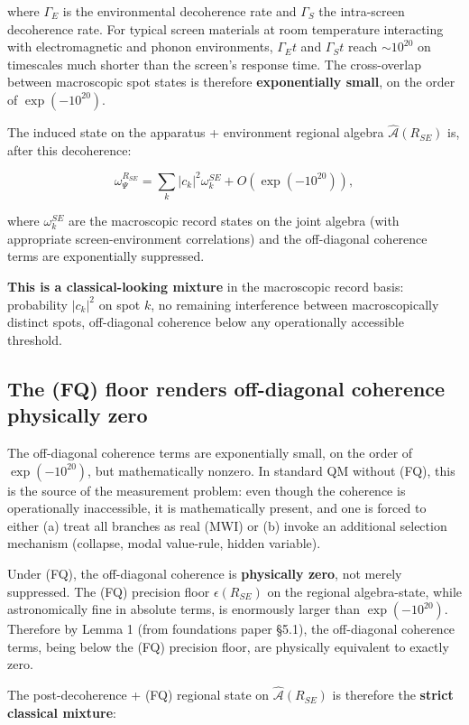 \documentclass[11pt,a4paper]{article}
\begin{document}
where $\Gamma_E$ is the environmental decoherence rate and $\Gamma_S$ the intra-screen decoherence rate. For typical screen materials at room temperature interacting with electromagnetic and phonon environments, $\Gamma_E t$ and $\Gamma_S t$ reach $\sim 10^{20}$ on timescales much shorter than the screen's response time. The cross-overlap between macroscopic spot states is therefore \textbf{exponentially small}, on the order of $\exp(-10^{20})$.

The induced state on the apparatus + environment regional algebra $\hat{\mathcal{A}}(R_{SE})$ is, after this decoherence:

\[
\omega_\Psi^{R_{SE}} = \sum_k |c_k|^2 \omega_k^{SE} + O(\exp(-10^{20})),
\]

where $\omega_k^{SE}$ are the macroscopic record states on the joint algebra (with appropriate screen-environment correlations) and the off-diagonal coherence terms are exponentially suppressed.

\textbf{This is a classical-looking mixture} in the macroscopic record basis: probability $|c_k|^2$ on spot $k$, no remaining interference between macroscopically distinct spots, off-diagonal coherence below any operationally accessible threshold.

\subsection{The (FQ) floor renders off-diagonal coherence physically zero}

The off-diagonal coherence terms are exponentially small, on the order of $\exp(-10^{20})$, but mathematically nonzero. In standard QM without (FQ), this is the source of the measurement problem: even though the coherence is operationally inaccessible, it is mathematically present, and one is forced to either (a) treat all branches as real (MWI) or (b) invoke an additional selection mechanism (collapse, modal value-rule, hidden variable).

Under (FQ), the off-diagonal coherence is \textbf{physically zero}, not merely suppressed. The (FQ) precision floor $\epsilon(R_{SE})$ on the regional algebra-state, while astronomically fine in absolute terms, is enormously larger than $\exp(-10^{20})$. Therefore by Lemma 1 (from foundations paper §5.1), the off-diagonal coherence terms, being below the (FQ) precision floor, are physically equivalent to exactly zero.

The post-decoherence + (FQ) regional state on $\hat{\mathcal{A}}(R_{SE})$ is therefore the \textbf{strict classical mixture}:
\end{document}
